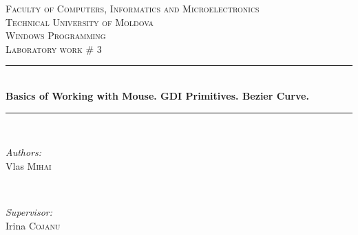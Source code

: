 \documentclass[12pt]{article}
\begin{document}
  \begin{titlepage}

 \newcommand{\HRule}{\rule{\linewidth}{0.5mm}} %
  \begin{center} %

  \textsc{\large Faculty of Computers, Informatics and Microelectronics}\\[0.5cm]
  \textsc{\large Technical University of Moldova}\\[1.2cm] %
  \vspace{35 mm}
  \textsc{\Large Windows Programming}\\[0.5cm] %
  \textsc{\large Laboratory work \# 3}\\[0.5cm] %

  \vspace{10 mm}
  \HRule \\[0.4cm]
  { \LARGE \bfseries Basics of Working with Mouse. GDI Primitives. Bezier Curve.}\\[0.4cm] %
  \HRule \\[1.5cm]

      \vspace{30mm}

      \begin{minipage}{0.4\textwidth}
      \begin{flushleft} \large
      \emph{Authors:}\\
      Vlas \textsc{Mihai}
      \end{flushleft}
      \end{minipage}
      ~
      \begin{minipage}{0.4\textwidth}
      \begin{flushright} \large
      \emph{Supervisor:} \\
      Irina \textsc{Cojanu} %
      \end{flushright}
      \end{minipage}\\[4cm]


\end{center}
\end{titlepage}
\end{document}
